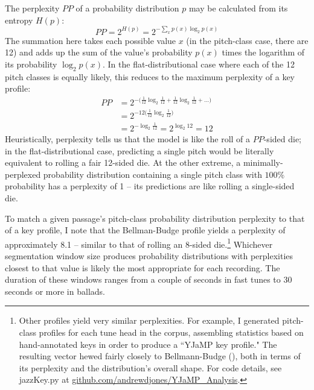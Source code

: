 The perplexity $PP$ of a probability distribution $p$ may be calculated from its entropy $H(p)$:
\begin{equation}
PP = 2^{H(p)} = 2^{-\sum_{x} p(x) \log_2 p(x)}
\end{equation}
The summation here takes each possible value $x$ (in the pitch-class case, there are 12) and adds up the sum of the value's probability $p(x)$ times the logarithm of its probability $\log_2 p(x)$.  In the flat-distributional case where each of the 12 pitch classes is equally likely, this reduces to the maximum perplexity of a key profile:
\begin{align*}
PP &= 2^{-\big(\frac{1}{12} \log_2 \frac{1}{12} + \frac{1}{12} \log_2 \frac{1}{12} + ...\big)} \\
 &= 2^{-12\big(\frac{1}{12} \log_2 \frac{1}{12}\big)} \\
 &= 2^{-\log_2 \frac{1}{12}} = 2^{\log_2 12} = 12
\end{align*}
Heuristically, perplexity tells us that the model is like the roll of a $PP$-sided die; in the flat-distributional case, predicting a single pitch would be literally equivalent to rolling a fair 12-sided die.  At the other extreme, a minimally-perplexed probability distribution containing a single pitch class with $100\%$ probability has a perplexity of 1 -- its predictions are like rolling a single-sided die.

To match a given passage's pitch-class probability distribution perplexity to that of a key profile, I note that the Bellman-Budge profile yields a perplexity of approximately 8.1 -- similar to that of rolling an 8-sided die.\footnote{Other profiles yield very similar perplexities.  For example, I generated pitch-class profiles for each tune head in the corpus, assembling statistics based on hand-annotated keys in order to produce a ``YJaMP key profile."  The resulting vector hewed fairly closely to Bellmann-Budge (\cite{bellmann2005}), both in terms of its perplexity and the distribution's overall shape.  For code details, see jazzKey.py at \href{github.com/andrewdjones/YJaMP_Analysis}{github.com/andrewdjones/YJaMP\_Analysis}.}  Whichever segmentation window size produces probability distributions with perplexities closest to that value is likely the most appropriate for each recording.  The duration of these windows ranges from a couple of seconds in fast tunes to 30 seconds or more in ballads.

